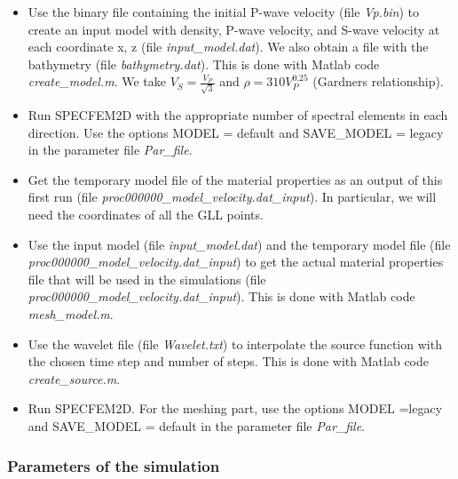 \documentclass{article}
\begin{document}
\begin{itemize}
	\item Use the binary file containing the initial P-wave velocity (file \textit{Vp.bin}) to create an input model with density, P-wave velocity, and S-wave velocity at each coordinate x, z (file \textit{input\_model.dat}). We also obtain a file with the bathymetry (file \textit{bathymetry.dat}). This is done with Matlab code \textit{create\_model.m}. We take $V_S = \frac{V_P}{\sqrt{3}}$ and $\rho = 310 V_P^{0.25}$ (Gardner\textsc{}s relationship).
	\item Run SPECFEM2D with the appropriate number of spectral elements in each direction. Use the options MODEL = default and SAVE\_MODEL = legacy in the parameter file \textit{Par\_file}.
	\item Get the temporary model file of the material properties as an output of this first run (file \textit{proc000000\_model\_velocity.dat\_input}). In particular, we will need the coordinates of all the GLL points. 
	\item Use the input model (file \textit{input\_model.dat}) and the temporary model file (file \textit{proc000000\_model\_velocity.dat\_input}) to get the actual material properties file that will be used in the simulations (file \textit{proc000000\_model\_velocity.dat\_input}). This is done with Matlab code \textit{mesh\_model.m}.
	\item Use the wavelet file (file \textit{Wavelet.txt}) to interpolate the source function with the chosen time step and number of steps. This is done with Matlab code \textit{create\_source.m}.
	\item Run SPECFEM2D. For the meshing part, use the options MODEL =legacy and SAVE\_MODEL = default  in the parameter file \textit{Par\_file}.
\end{itemize}

\subsubsection{Parameters of the simulation}
\end{document}
